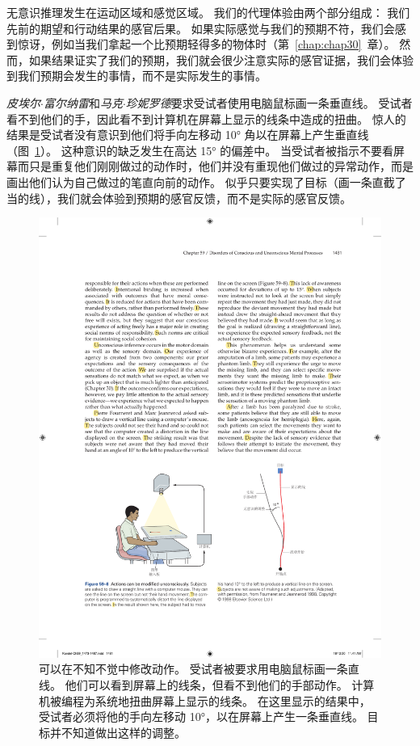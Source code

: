 无意识推理发生在运动区域和感觉区域。
我们的代理体验由两个部分组成：
我们先前的期望和行动结果的感官后果。
如果实际感觉与我们的预期不符，我们会感到惊讶，例如当我们拿起一个比预期轻得多的物体时（第~\ref{chap:chap30}~章）。
然而，如果结果证实了我们的预期，我们就会很少注意实际的感官证据，我们会体验到我们预期会发生的事情，而不是实际发生的事情。


\textit{皮埃尔$\cdot$富尔纳雷}和\textit{马克$\cdot$珍妮罗德}要求受试者使用电脑鼠标画一条垂直线。
受试者看不到他们的手，因此看不到计算机在屏幕上显示的线条中造成的扭曲。
惊人的结果是受试者没有意识到他们将手向左移动 10° 角以在屏幕上产生垂直线（图~\ref{fig:59_8}）。
这种意识的缺乏发生在高达 15° 的偏差中。
当受试者被指示不要看屏幕而只是重复他们刚刚做过的动作时，他们并没有重现他们做过的异常动作，而是画出他们认为自己做过的笔直向前的动作。
似乎只要实现了目标（画一条直截了当的线），我们就会体验到预期的感官反馈，而不是实际的感官反馈。


\begin{figure}[htbp]
	\centering
	\includegraphics[width=0.93\linewidth]{chap59/fig_59_8}
	\caption{可以在不知不觉中修改动作。
		受试者被要求用电脑鼠标画一条直线。
		他们可以看到屏幕上的线条，但看不到他们的手部动作。
		计算机被编程为系统地扭曲屏幕上显示的线条。
		在这里显示的结果中，受试者必须将他的手向左移动 10°，以在屏幕上产生一条垂直线。
		目标并不知道做出这样的调整\cite{fourneret1998limited}。}
	\label{fig:59_8}
\end{figure}


